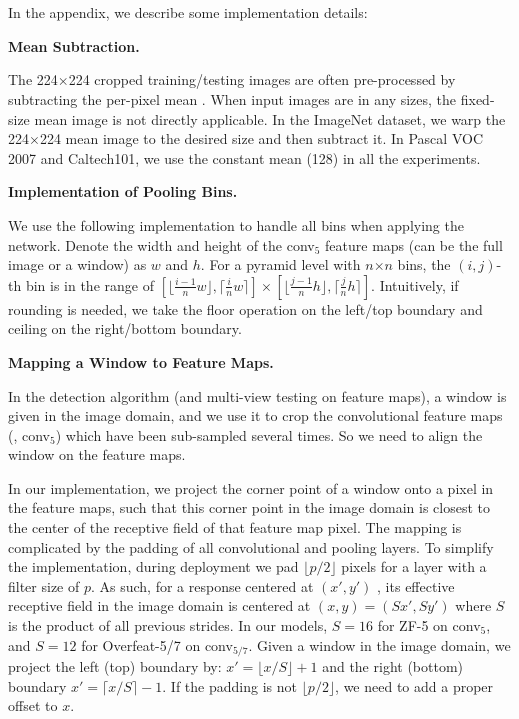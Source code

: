 \documentclass[10pt,journal,cspaper,compsoc]{IEEEtran}
\begin{document}
\appendices
\section{}
In the appendix, we describe some implementation details:

\vspace{6pt}
\noindent\textbf{Mean Subtraction.}

The 224$\times$224 cropped training/testing images are often pre-processed by subtracting the per-pixel mean \cite{Krizhevsky2012}. When input images are in any sizes, the fixed-size mean image is not directly applicable. In the ImageNet dataset, we warp the 224$\times$224 mean image to the desired size and then subtract it.
In Pascal VOC 2007 and Caltech101, we use the constant mean (128) in all the experiments.

\vspace{6pt}
\noindent\textbf{Implementation of Pooling Bins.}

We use the following implementation to handle all bins when applying the network. Denote the width and height of the conv$_5$ feature maps (can be the full image or a window) as $w$ and $h$. For a pyramid level with $n$$\times$$n$ bins, the $(i,j)$-th bin is in the range of $[\lfloor\frac{i-1}{n}w\rfloor, \lceil\frac{i}{n}w\rceil]\times[\lfloor\frac{j-1}{n}h\rfloor, \lceil\frac{j}{n}h\rceil]$. Intuitively, if rounding is needed, we take the floor operation on the left/top boundary and ceiling on the right/bottom boundary.

\vspace{6pt}
\noindent\textbf{Mapping a Window to Feature Maps.}

In the detection algorithm (and multi-view testing on feature maps), a window is given in the image domain, and we use it to crop the convolutional feature maps (\eg, conv$_5$) which have been sub-sampled several times. So we need to align the window on the feature maps.

In our implementation, we project the corner point of a window onto a pixel in the feature maps, such that this corner point in the image domain is closest to the center of the receptive field of that feature map pixel.
The mapping is complicated by the padding of all convolutional and pooling layers. To simplify the implementation, during deployment we pad $\lfloor p/2 \rfloor$ pixels for a layer with a filter size of $p$. As such, for a response centered at $(x', y')$ , its effective receptive field in the image domain is centered at $(x,y)=(Sx', Sy')$ where $S$ is the product of all previous strides. In our models, $S=16$ for ZF-5 on conv$_5$, and $S=12$ for Overfeat-5/7 on conv$_{5/7}$. Given a window in the image domain, we project the left (top) boundary by: $x' = \lfloor x /S\rfloor+1$ and the right (bottom) boundary $x' = \lceil x /S \rceil-1$.
If the padding is not $\lfloor p/2 \rfloor$, we need to add a proper offset to $x$.
\end{document}

